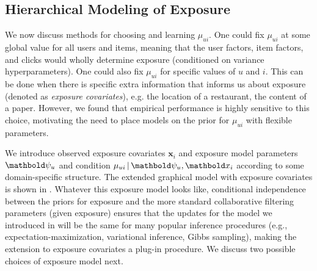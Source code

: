 \subsection{Hierarchical Modeling of Exposure}
\label{sec:modeling_mu}

We now discuss methods for choosing and learning $\mu_{ui}$. 
One could fix $\mu_{ui}$ 
at some global value for all users and items, 
meaning that the user factors, item factors, and clicks 
would wholly determine exposure (conditioned on variance hyperparameters). 
One could also fix $\mu_{ui}$ for specific values of $u$ and $i$. 
This can be done when there is specific extra information 
that informs us about exposure (denoted as \emph{exposure covariates}), e.g. the location of a restaurant, the content of a paper. 
However, we found that empirical performance is highly sensitive to this choice, 
motivating the need to place models on the prior for $\mu_{ui}$ 
with flexible parameters. 

We introduce observed exposure covariates $\mathbf{x}_i$ and exposure model parameters $\mb\psi_{u}$ 
and condition $\mu_{ui} \g \mb{\psi}_{u}, \mb{x}_{i}$ 
according to some domain-specific structure. 
The extended graphical model with exposure covariates 
is shown in . 
Whatever this exposure model looks like, 
conditional independence between the priors for exposure 
and the more standard collaborative filtering parameters (given exposure) 
ensures that the updates for the model we introduced in 
will be the same for many popular inference procedures (e.g., expectation-maximization, variational inference, Gibbs sampling), 
making the extension to exposure covariates a plug-in procedure. 
We discuss two possible choices of exposure model next.

%
%

